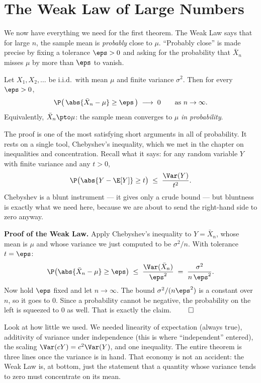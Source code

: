 \section{The Weak Law of Large Numbers}
\label{ch20:wlln}

We now have everything we need for the first theorem. The Weak Law says that for large $n$, the sample mean is \emph{probably} close to $\mu$. ``Probably close'' is made precise by fixing a tolerance $\eps > 0$ and asking for the probability that $\bar X_n$ misses $\mu$ by more than $\eps$ to vanish.

\begin{theorem}
\label{ch20:thm-wlln}
Let $X_1, X_2, \dots$ be i.i.d.\ with mean $\mu$ and finite variance $\sigma^2$. Then for every $\eps > 0$,
\[
  \P\bigl(\,\abs{\bar X_n - \mu} \ge \eps\,\bigr) \;\longrightarrow\; 0 \qquad \text{as } n \to \infty.
\]
Equivalently, $\bar X_n \pto \mu$: the sample mean converges to $\mu$ \emph{in probability}.
\end{theorem}

The proof is one of the most satisfying short arguments in all of probability. It rests on a single tool, Chebyshev's inequality, which we met in the chapter on inequalities and concentration. Recall what it says: for any random variable $Y$ with finite variance and any $t > 0$,
\[
  \P\bigl(\abs{Y - \E[Y]} \ge t\bigr) \;\le\; \frac{\Var(Y)}{t^2}.
\]
Chebyshev is a blunt instrument --- it gives only a crude bound --- but bluntness is exactly what we need here, because we are about to send the right-hand side to zero anyway.

\begin{whybox}
\textbf{Proof of the Weak Law.} Apply Chebyshev's inequality to $Y = \bar X_n$, whose mean is $\mu$ and whose variance we just computed to be $\sigma^2/n$. With tolerance $t = \eps$:
\[
  \P\bigl(\abs{\bar X_n - \mu} \ge \eps\bigr) \;\le\; \frac{\Var(\bar X_n)}{\eps^2} \;=\; \frac{\sigma^2}{n\,\eps^2}.
\]
Now hold $\eps$ fixed and let $n \to \infty$. The bound $\sigma^2/(n\eps^2)$ is a constant over $n$, so it goes to $0$. Since a probability cannot be negative, the probability on the left is squeezed to $0$ as well. That is exactly the claim. $\qed$
\end{whybox}

Look at how little we used. We needed linearity of expectation (always true), additivity of variance under independence (this is where ``independent'' entered), the scaling $\Var(cY)=c^2\Var(Y)$, and one inequality. The entire theorem is three lines once the variance is in hand. That economy is not an accident: the Weak Law is, at bottom, just the statement that a quantity whose variance tends to zero must concentrate on its mean.

